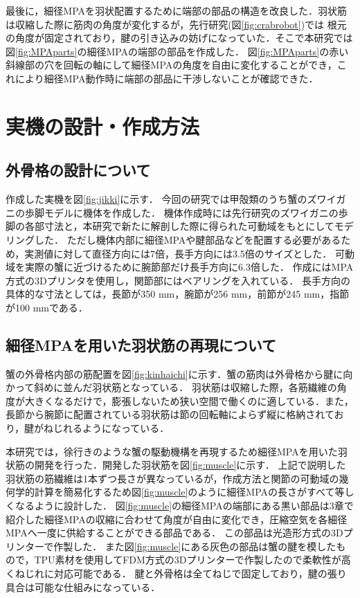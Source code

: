 \documentclass{jarticle}
\begin{document}
最後に，細径MPAを羽状配置するために端部の部品の構造を改良した．羽状筋は収縮した際に筋肉の角度が変化するが，先行研究(図\ref{fig:crabrobot})では
根元の角度が固定されており，腱の引き込みの妨げになっていた．そこで本研究では図\ref{fig:MPAparts}の細径MPAの端部の部品を作成した．
図\ref{fig:MPAparts}の赤い斜線部の穴を回転の軸にして細径MPAの角度を自由に変化することができ，これにより細径MPA動作時に端部の部品に干渉しないことが確認できた．
\vspace*{-2mm}
\section{実機の設計・作成方法}
\vspace*{-1mm}
\subsection{外骨格の設計について}
作成した実機を図\ref{fig:jikki}に示す．
今回の研究では甲殻類のうち蟹のズワイガニの歩脚モデルに機体を作成した．
機体作成時には先行研究\cite{crabrobot2}のズワイガニの歩脚の各部寸法と，本研究で新たに解剖した際に得られた可動域をもとにしてモデリングした．
ただし機体内部に細径MPAや腱部品などを配置する必要があるため，実測値に対して直径方向には7倍，長手方向には3.5倍のサイズとした．
可動域を実際の蟹に近づけるために腕節部だけ長手方向に6.3倍した．
作成にはMPA方式の3Dプリンタを使用し，関節部にはベアリングを入れている．
長手方向の具体的な寸法としては，長節が350 mm，腕節が256 mm，前節が245 mm，指節が100 mmである．
\subsection{細径MPAを用いた羽状筋の再現について}
蟹の外骨格内部の筋配置を図\ref{fig:kinhaichi}に示す．蟹の筋肉は外骨格から腱に向かって斜めに並んだ羽状筋となっている．
羽状筋は収縮した際，各筋繊維の角度が大きくなるだけで，膨張しないため狭い空間で働くのに適している．また，長節から腕節に配置されている羽状筋は節の回転軸によらず縦に格納されており，腱がねじれるようになっている．

本研究では，徐行きのような蟹の駆動機構を再現するため細径MPAを用いた羽状筋の開発を行った．開発した羽状筋を図\ref{fig:muscle}に示す．
上記で説明した羽状筋の筋繊維は1本ずつ長さが異なっているが，作成方法と関節の可動域の幾何学的計算を簡易化するため図\ref{fig:muscle}のように細径MPAの長さがすべて等しくなるように設計した．
図\ref{fig:muscle}の細径MPAの端部にある黒い部品は3章で紹介した細径MPAの収縮に合わせて角度が自由に変化でき，圧縮空気を各細径MPAへ一度に供給することができる部品である．
この部品は光造形方式の3Dプリンターで作製した．
また図\ref{fig:muscle}にある灰色の部品は蟹の腱を模したもので，TPU素材を使用してFDM方式の3Dプリンターで作製したので柔軟性が高くねじれに対応可能である．
腱と外骨格は全てねじで固定しており，腱の張り具合は可能な仕組みになっている．
\end{document}
